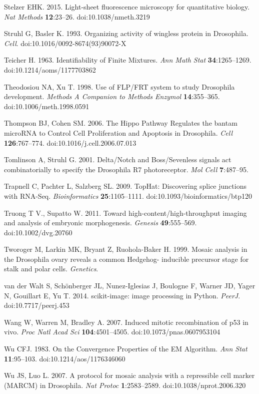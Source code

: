 Stelzer EHK. 2015. Light-sheet fluorescence microscopy for quantitative biology. \emph{Nat Methods} \textbf{12}:23--26. doi:10.1038/nmeth.3219

Struhl G, Basler K. 1993. Organizing activity of wingless protein in Drosophila. \emph{Cell}. doi:10.1016/0092-8674(93)90072-X

Teicher H. 1963. Identifiability of Finite Mixtures. \emph{Ann Math Stat} \textbf{34}:1265--1269. doi:10.1214/aoms/1177703862

Theodosiou NA, Xu T. 1998. Use of FLP/FRT system to study Drosophila development. \emph{Methods A Companion to Methods Enzymol} \textbf{14}:355--365. doi:10.1006/meth.1998.0591

Thompson BJ, Cohen SM. 2006. The Hippo Pathway Regulates the bantam microRNA to Control Cell Proliferation and Apoptosis in Drosophila. \emph{Cell} \textbf{126}:767--774. doi:10.1016/j.cell.2006.07.013

Tomlinson A, Struhl G. 2001. Delta/Notch and Boss/Sevenless signals act combinatorially to specify the Drosophila R7 photoreceptor. \emph{Mol Cell} \textbf{7}:487--95.

Trapnell C, Pachter L, Salzberg SL. 2009. TopHat: Discovering splice junctions with RNA-Seq. \emph{Bioinformatics} \textbf{25}:1105--1111. doi:10.1093/bioinformatics/btp120

Truong T V., Supatto W. 2011. Toward high-content/high-throughput imaging and analysis of embryonic morphogenesis. \emph{Genesis} \textbf{49}:555--569. doi:10.1002/dvg.20760

Tworoger M, Larkin MK, Bryant Z, Ruohola-Baker H. 1999. Mosaic analysis in the Drosophila ovary reveals a common Hedgehog- inducible precursor stage for stalk and polar cells. \emph{Genetics}.

van der Walt S, Schönberger JL, Nunez-Iglesias J, Boulogne F, Warner JD, Yager N, Gouillart E, Yu T. 2014. scikit-image: image processing in Python. \emph{PeerJ}. doi:10.7717/peerj.453

Wang W, Warren M, Bradley A. 2007. Induced mitotic recombination of p53 in vivo. \emph{Proc Natl Acad Sci} \textbf{104}:4501--4505. doi:10.1073/pnas.0607953104

Wu CFJ. 1983. On the Convergence Properties of the EM Algorithm. \emph{Ann Stat} \textbf{11}:95--103. doi:10.1214/aos/1176346060

Wu JS, Luo L. 2007. A protocol for mosaic analysis with a repressible cell marker (MARCM) in Drosophila. \emph{Nat Protoc} \textbf{1}:2583--2589. doi:10.1038/nprot.2006.320

